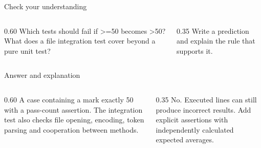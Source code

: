 \documentclass[10pt,aspectratio=169]{beamer}
\begin{document}
\begin{frame}[fragile,t]{Check your understanding}
\begin{columns}[T,onlytextwidth]\begin{column}{0.60\textwidth}
Which tests should fail if \textgreater{}=50 becomes \textgreater{}50? What does a file integration test cover beyond a pure unit test?
\end{column}\begin{column}{0.35\textwidth}\small
Write a prediction and explain the rule that supports it.
\end{column}\end{columns}
\end{frame}

\begin{frame}[fragile,t]{Answer and explanation}
\begin{columns}[T,onlytextwidth]\begin{column}{0.60\textwidth}
A case containing a mark exactly 50 with a pass-count assertion. The integration test also checks file opening, encoding, token parsing and cooperation between methods.
\end{column}\begin{column}{0.35\textwidth}\small
No. Executed lines can still produce incorrect results. Add explicit assertions with independently calculated expected averages.
\end{column}\end{columns}
\end{frame}
\end{document}
